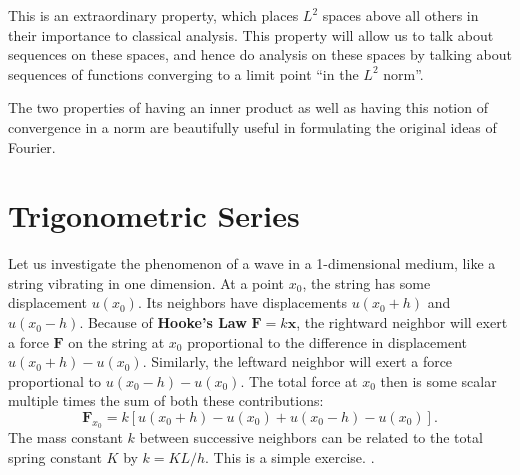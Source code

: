 	This is an extraordinary property, which places $L^2$ spaces above all others in their importance to classical analysis. This property will allow us to talk about sequences on these spaces, and hence do analysis on these spaces by talking about sequences of functions converging to a limit point ``in the $L^2$ norm''. 
	
	The two properties of having an inner product as well as having this notion of convergence in a norm are beautifully useful in formulating the original ideas of Fourier. 

\section{Trigonometric Series} %
\label{sec:trigonometric_series}

	Let us investigate the phenomenon of a wave in a 1-dimensional medium, like a string vibrating in one dimension. At a point $x_0$, the string has some displacement $u(x_0)$. Its neighbors have displacements $u(x_0 + h)$ and $u(x_0 - h)$. 
	Because of \textbf{Hooke's Law} $\mathbf F = k \mathbf x$, the rightward neighbor will exert a force $\mathbf F$ on the string at $x_0$ proportional to the difference in displacement $u(x_0 + h) - u(x_0)$. Similarly, the leftward neighbor will exert a force proportional to $u(x_0 - h) - u(x_0)$. The total force at $x_0$ then is some scalar multiple times the sum of both these contributions:
	\begin{equation}
		\mathbf F_{x_0} = k [u(x_0 + h) - u(x_0) + u(x_0 - h) - u(x_0)].
	\end{equation}
	The mass constant $k$ between successive neighbors can be related to the total spring constant $K$ by $k = K L / h$. This is a simple exercise. . 
	
